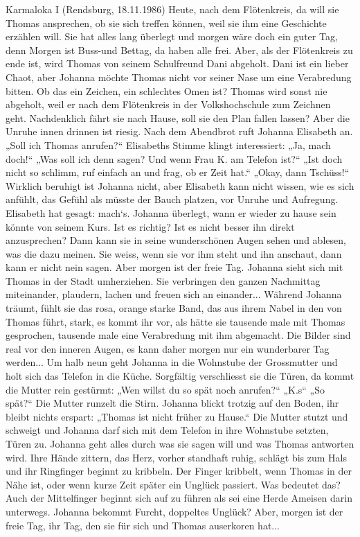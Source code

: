 Karmaloka I (Rendsburg, 18.11.1986)
Heute, nach dem Flötenkreis, da will sie Thomas ansprechen, ob sie sich treffen können, weil sie ihm eine Geschichte erzählen will. Sie hat alles lang überlegt und morgen wäre doch ein guter Tag, denn Morgen ist Buss-und Bettag, da haben alle frei.
Aber, als der Flötenkreis zu ende ist, wird Thomas von seinem Schulfreund Dani abgeholt. Dani ist ein lieber Chaot, aber Johanna möchte Thomas nicht vor seiner Nase um eine Verabredung bitten. Ob das ein Zeichen, ein schlechtes Omen ist? Thomas wird sonst nie abgeholt, weil er nach dem Flötenkreis in der Volkshochschule zum Zeichnen geht. Nachdenklich fährt sie nach Hause, soll sie den Plan fallen lassen? Aber die Unruhe innen drinnen ist riesig. Nach dem Abendbrot ruft Johanna Elisabeth an. „Soll ich Thomas anrufen?“ Elisabeths Stimme klingt interessiert: „Ja, mach doch!“ „Was soll ich denn sagen? Und wenn Frau K. am Telefon ist?“ „Ist doch nicht so schlimm, ruf einfach an und frag, ob er Zeit hat.“ „Okay, dann Tschüss!“ Wirklich beruhigt ist Johanna nicht, aber Elisabeth kann nicht wissen, wie es sich anfühlt, das Gefühl als müsste der Bauch platzen, vor Unruhe und Aufregung.
Elisabeth hat gesagt: mach`s. Johanna überlegt, wann er wieder zu hause sein könnte von seinem Kurs. Ist es richtig? Ist es nicht besser ihn direkt anzusprechen? Dann kann sie in seine wunderschönen Augen sehen und ablesen, was die dazu meinen. Sie weiss, wenn sie vor ihm steht und ihn anschaut, dann kann er nicht nein sagen. Aber morgen ist der freie Tag. Johanna  sieht sich mit Thomas in der Stadt umherziehen. Sie verbringen den ganzen Nachmittag miteinander, plaudern, lachen und freuen sich an einander...
Während Johanna träumt, fühlt sie das rosa, orange starke Band, das aus ihrem Nabel in den von Thomas führt, stark, es kommt ihr vor, als hätte sie tausende male mit Thomas gesprochen, tausende male eine Verabredung mit ihm abgemacht. Die Bilder sind real vor den inneren Augen, es kann daher morgen nur ein wunderbarer Tag werden...
Um halb neun geht Johanna in die Wohnstube der Grossmutter und holt sich das Telefon in die Küche. Sorgfältig verschliesst sie die Türen, da kommt die Mutter rein gestürmt: „Wen willst du so spät noch anrufen?“ „K.s“ „So spät?“ Die Mutter runzelt die Stirn. Johanna blickt trotzig auf den Boden, ihr bleibt nichts erspart: „Thomas ist nicht früher zu Hause.“ Die Mutter stutzt und schweigt und Johanna darf sich mit dem Telefon in ihre Wohnstube setzten, Türen zu.
Johanna geht alles durch was sie sagen will und was Thomas antworten wird. Ihre Hände zittern, das Herz, vorher standhaft ruhig, schlägt bis zum Hals und ihr Ringfinger beginnt zu kribbeln. Der Finger kribbelt, wenn Thomas in der Nähe ist, oder wenn kurze Zeit später ein Unglück passiert. Was bedeutet das? Auch der Mittelfinger beginnt sich auf zu führen  als sei eine Herde Ameisen darin unterwegs. Johanna bekommt Furcht, doppeltes Unglück? Aber, morgen ist der freie Tag, ihr Tag, den sie für sich und Thomas auserkoren hat...
